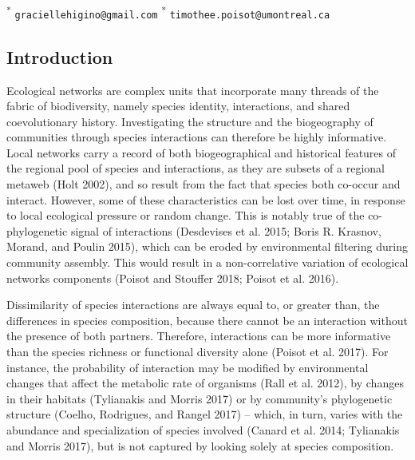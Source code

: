 \documentclass[12pt]{article}
\begin{document}
\textsuperscript{*}\,\,\texttt{graciellehigino@gmail.com}
\textsuperscript{*}\,\,\texttt{timothee.poisot@umontreal.ca}

\clearpage
\linenumbers
\doublespacing

\hypertarget{introduction}{%
\subsection{Introduction}\label{introduction}}

Ecological networks are complex units that incorporate many threads of
the fabric of biodiversity, namely species identity, interactions, and
shared coevolutionary history. Investigating the structure and the
biogeography of communities through species interactions can therefore
be highly informative. Local networks carry a record of both
biogeographical and historical features of the regional pool of species
and interactions, as they are subsets of a regional metaweb (Holt 2002),
and so result from the fact that species both co-occur and interact.
However, some of these characteristics can be lost over time, in
response to local ecological pressure or random change. This is notably
true of the co-phylogenetic signal of interactions (Desdevises et al.
2015; Boris R. Krasnov, Morand, and Poulin 2015), which can be eroded by
environmental filtering during community assembly. This would result in
a non-correlative variation of ecological networks components (Poisot
and Stouffer 2018; Poisot et al. 2016).

Dissimilarity of species interactions are always equal to, or greater
than, the differences in species composition, because there cannot be an
interaction without the presence of both partners. Therefore,
interactions can be more informative than the species richness or
functional diversity alone (Poisot et al. 2017). For instance, the
probability of interaction may be modified by environmental changes that
affect the metabolic rate of organisms (Rall et al. 2012), by changes in
their habitats (Tylianakis and Morris 2017) or by community's
phylogenetic structure (Coelho, Rodrigues, and Rangel 2017) -- which, in
turn, varies with the abundance and specialization of species involved
(Canard et al. 2014; Tylianakis and Morris 2017), but is not captured by
looking solely at species composition.
\end{document}
